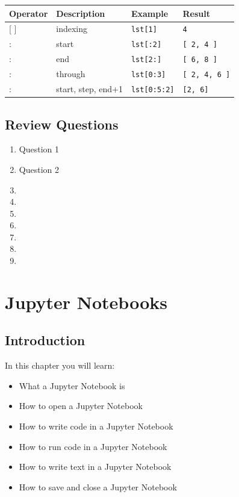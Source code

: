 \documentclass{book}
\begin{document}
\begin{longtable}[]{@{}llll@{}}
\toprule
Operator & Description & Example & Result\tabularnewline
\midrule
\endhead
{[} {]} & indexing & \lstinline!lst[1]! & \lstinline!4!\tabularnewline
: & start & \lstinline!lst[:2]! & \lstinline![ 2, 4 ]!\tabularnewline
: & end & \lstinline!lst[2:]! & \lstinline![ 6, 8 ]!\tabularnewline
: & through & \lstinline!lst[0:3]! &
\lstinline![ 2, 4, 6 ]!\tabularnewline
: & start, step, end+1 & \lstinline!lst[0:5:2]! &
\lstinline![2, 6]!\tabularnewline
\bottomrule
\end{longtable}
    




    
        \section{Review Questions}\label{review-questions}
    




    
        \begin{enumerate}
\def\labelenumi{\arabic{enumi}.}
\item
  Question 1
\item
  Question 2
\item
\item
\item
\item
\item
\item
\item
\end{enumerate}
    




    
        \chapter{Jupyter Notebooks}\label{jupyter-notebooks}
    




    
        \section{Introduction}\label{introduction}
    




    
        In this chapter you will learn:

\begin{itemize}
\item
  What a Jupyter Notebook is
\item
  How to open a Jupyter Notebook
\item
  How to write code in a Jupyter Notebook
\item
  How to run code in a Jupyter Notebook
\item
  How to write text in a Jupyter Notebook
\item
  How to save and close a Jupyter Notebook
\end{itemize}
    
\end{document}

